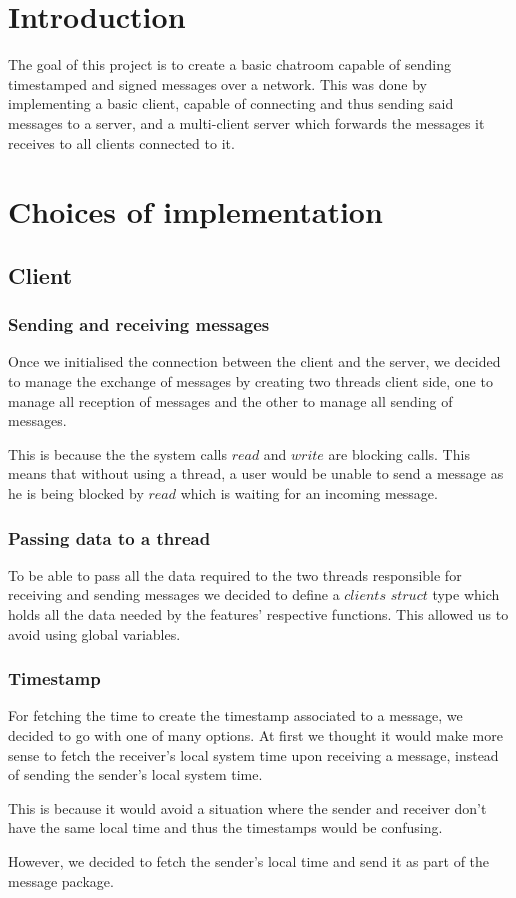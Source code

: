 \documentclass{article}
\begin{document}
\tableofcontents
\newpage

\section{Introduction}

The goal of this project is to create a basic chatroom capable of sending timestamped and signed messages over a network. This was done by implementing a basic client, capable of connecting and thus sending said messages to a server, and  a multi-client server which forwards the messages it receives to all clients connected to it.

\section{Choices of implementation}

\subsection{Client}

\subsubsection{Sending and receiving messages}
Once we initialised the connection between the client and the server, we decided to manage the exchange of messages by creating two threads client side, one to manage all reception of messages and the other to manage all sending of messages. \par
This is because the the system calls $read$ and $write$ are blocking calls. This means that without using a thread, a user would be unable to send a message as he is being blocked by $read$ which is waiting for an incoming message.

\subsubsection{Passing data to a thread}
To be able to pass all the data required to the two threads responsible for receiving and sending messages we decided to define a $clients$ $struct$ type which holds all the data needed by the features' respective functions. This allowed us to avoid using global variables.

\subsubsection{Timestamp}
For fetching the time to create the timestamp associated to a message, we decided to go with one of many options. At first we thought it would make more sense to fetch the receiver's local system time upon receiving a message, instead of sending the sender's local system time. \par
This is because it would avoid a situation where the sender and receiver don't have the same local time and thus the timestamps would be confusing. \par
However, we decided to fetch the sender's local time and send it as part of the message package.
\end{document}
